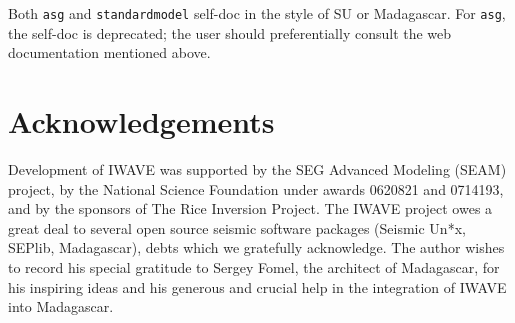 Both {\tt asg} and {\tt standardmodel} self-doc in the style of SU or
Madagascar. For {\tt asg}, the self-doc is deprecated; the user should
preferentially consult the web documentation mentioned above.

\section{Acknowledgements}
Development of IWAVE was supported by the SEG Advanced Modeling (SEAM)
project, by the National Science Foundation under awards 0620821 and
0714193, and by the sponsors of The Rice Inversion Project. The IWAVE
project owes a great deal to several open source seismic software
packages (Seismic Un*x, SEPlib, Madagascar), debts which we gratefully
acknowledge. The author wishes to record his special gratitude to
Sergey Fomel, the architect of Madagascar, for his inspiring ideas and
his generous and crucial help in the integration of IWAVE into Madagascar.





